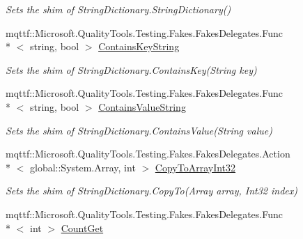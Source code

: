 \begin{DoxyCompactItemize}
\begin{DoxyCompactList}\small\item\em Sets the shim of String\-Dictionary.\-String\-Dictionary()\end{DoxyCompactList}\item 
mqttf\-::\-Microsoft.\-Quality\-Tools.\-Testing.\-Fakes.\-Fakes\-Delegates.\-Func\\*
$<$ string, bool $>$ \hyperlink{class_system_1_1_collections_1_1_specialized_1_1_fakes_1_1_shim_string_dictionary_ac2700c3aced88eca21a5224769f75c84}{Contains\-Key\-String}
\begin{DoxyCompactList}\small\item\em Sets the shim of String\-Dictionary.\-Contains\-Key(\-String key)\end{DoxyCompactList}\item 
mqttf\-::\-Microsoft.\-Quality\-Tools.\-Testing.\-Fakes.\-Fakes\-Delegates.\-Func\\*
$<$ string, bool $>$ \hyperlink{class_system_1_1_collections_1_1_specialized_1_1_fakes_1_1_shim_string_dictionary_afdb5b8f1a32957d3a9f79dc2bbaf22fb}{Contains\-Value\-String}
\begin{DoxyCompactList}\small\item\em Sets the shim of String\-Dictionary.\-Contains\-Value(\-String value)\end{DoxyCompactList}\item 
mqttf\-::\-Microsoft.\-Quality\-Tools.\-Testing.\-Fakes.\-Fakes\-Delegates.\-Action\\*
$<$ global\-::\-System.\-Array, int $>$ \hyperlink{class_system_1_1_collections_1_1_specialized_1_1_fakes_1_1_shim_string_dictionary_ac74fdaa7a11437f629933fc8f75b8d4b}{Copy\-To\-Array\-Int32}
\begin{DoxyCompactList}\small\item\em Sets the shim of String\-Dictionary.\-Copy\-To(\-Array array, Int32 index)\end{DoxyCompactList}\item 
mqttf\-::\-Microsoft.\-Quality\-Tools.\-Testing.\-Fakes.\-Fakes\-Delegates.\-Func\\*
$<$ int $>$ \hyperlink{class_system_1_1_collections_1_1_specialized_1_1_fakes_1_1_shim_string_dictionary_a0249897bd388c79be6fdd6a59f4ebd8e}{Count\-Get}

\end{DoxyCompactItemize}

